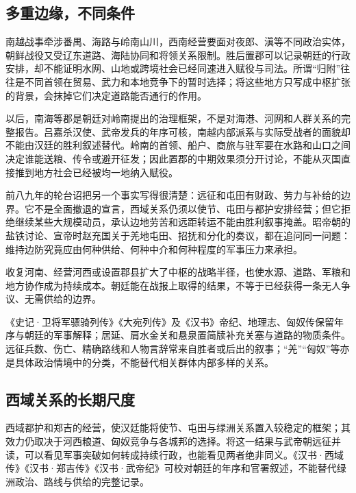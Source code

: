 \subsection{多重边缘，不同条件}

南越战事牵涉番禺、海路与岭南山川，西南经营要面对夜郎、滇等不同政治实体，朝鲜战役又受辽东道路、海陆协同和将领关系限制。胜后置郡可以记录朝廷的行政安排，却不能证明水网、山地或跨境社会已经同速进入赋役与司法。所谓“归附”往往是不同首领在贸易、武力和本地竞争下的暂时选择；将这些地方只写成中枢扩张的背景，会抹掉它们决定道路能否通行的作用。

以后，南海等郡是朝廷对岭南提出的治理框架，不是对海港、河网和人群关系的完整报告。吕嘉杀汉使、武帝发兵的年序可核，南越内部派系与实际受战者的面貌却不能由汉廷的胜利叙述替代。岭南的首领、船户、商旅与驻军要在水路和山口之间决定谁能送粮、传令或避开征发；因此置郡的中期效果须分开讨论，不能从灭国直接推到地方社会已经被均一地纳入赋役。

前八九年的轮台诏把另一个事实写得很清楚：远征和屯田有财政、劳力与补给的边界。它不是全面撤退的宣言，西域关系仍须以使节、屯田与都护安排经营；但它拒绝继续某些大规模动员，承认边地劳苦和远距转运不能由胜利叙事掩盖。昭帝朝的盐铁讨论、宣帝时赵充国关于羌地屯田、招抚和分化的奏议，都在追问同一问题：维持边防究竟应由何种供给、何种中介和何种程度的军事压力来承担。

\begin{turningpoint}[边地的胜利为何留下财政问题]
收复河南、经营河西或设置郡县扩大了中枢的战略半径，也使水源、道路、军粮和地方协作成为持续成本。朝廷能在战报上取得的结果，不等于已经获得一条无人争议、无需供给的边界。
\end{turningpoint}

\begin{sourcenote}[战绩、路线与边地名称]
《史记·卫将军骠骑列传》《大宛列传》及《汉书》帝纪、地理志、匈奴传保留年序与朝廷的军事解释；居延、肩水金关和悬泉置简牍补充关塞与道路的物质条件。远征兵数、伤亡、精确路线和人物言辞常来自胜者或后出的叙事；“羌”“匈奴”等亦是具体政治情境中的分类，不能替代相关群体内部多样的关系。
\end{sourcenote}
\subsection{西域关系的长期尺度}

西域都护和郑吉的经营，使汉廷能将使节、屯田与绿洲关系置入较稳定的框架；其效力仍取决于河西粮道、匈奴竞争与各城邦的选择。将这一结果与武帝朝远征并读，可以看见军事突破如何转成持续行政，也能看见两者绝非同义。《汉书·西域传》《汉书·郑吉传》《汉书·武帝纪》可校对朝廷的年序和官署叙述，不能替代绿洲政治、路线与供给的完整记录。

